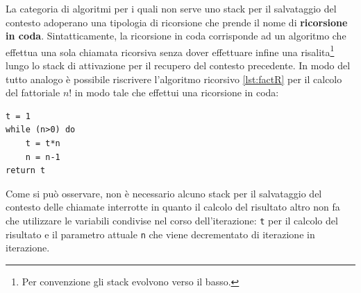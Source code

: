 La categoria di algoritmi per i quali non serve uno stack per il salvataggio del contesto adoperano una tipologia di ricorsione che prende il nome di \textbf{ricorsione in coda}. Sintatticamente, la ricorsione in coda corrisponde ad un algoritmo che effettua una sola chiamata ricorsiva senza dover effettuare infine una risalita\footnote{Per convenzione gli stack evolvono verso il basso.} lungo lo stack di attivazione per il recupero del contesto precedente. In modo del tutto analogo è possibile riscrivere l'algoritmo ricorsivo \ref{lst:factR} per il calcolo del fattoriale $n!$ in modo tale che effettui una ricorsione in coda:
\begin{lstlisting}[language=asd,caption={\textsc{Fattoriale\_Iter}(N)}]
t = 1
while (n>0) do
	t = t*n
	n = n-1
return t
\end{lstlisting}

Come si può osservare, non è necessario alcuno stack per il salvataggio del contesto delle chiamate interrotte in quanto il calcolo del risultato altro non fa che utilizzare le variabili condivise nel corso dell'iterazione: \texttt{t} per il calcolo del risultato e il parametro attuale \texttt{n} che viene decrementato di iterazione in iterazione.

